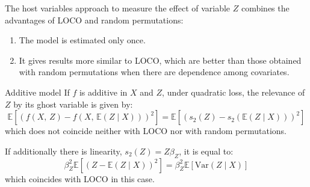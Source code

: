 \begin{note}
	The host variables approach to measure the effect of variable $Z$ combines
	the advantages of LOCO and random permutations:
	\begin{enumerate}
		\item The model is estimated only once.
		\item It gives results more similar to LOCO, which are better than those
		      obtained with random permutations when there are dependence among
		      covariates.
	\end{enumerate}
\end{note}

\begin{example}{Additive model}{}
	If $f$ is additive in $X$ and $Z$, under quadratic loss,
	the relevance of $Z$ by its ghost variable is given by:
	\begin{equation*}
		\mathds{E} \left[
			\left( f(X,\,Z) - f(X,\,\mathds{E}(Z \mid X)) \right)^2
			\right] =
		\mathds{E} \left[
			\left( s_2(Z) - s_2(\mathds{E}(Z \mid X)) \right)^2
			\right]
	\end{equation*}
	which does not coincide neither with LOCO nor with random permutations.

	If additionally there is linearity, $s_2(Z) = Z\beta_Z$, it is
	equal to:
	\begin{equation*}
		\beta_Z^2 \mathds{E} \left[
			\left( Z - \mathds{E}(Z \mid X)\right)^2
			\right] =
		\beta_Z^2 \mathds{E} \left[
			\text{Var}(Z \mid X)
			\right]
	\end{equation*}
	which coincides with LOCO in this case.
\end{example}

